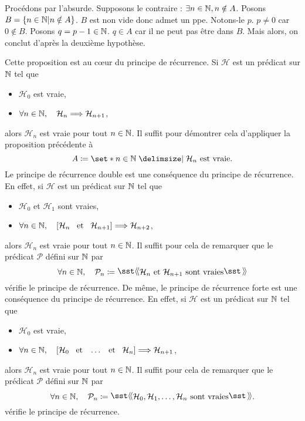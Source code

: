 \documentclass{magnoliaold}
\begin{document}
\begin{preuve}
Procédons par l'absurde. Supposons le contraire : $\exists n\in \mathbb{N}, n\notin A$.
Posons $B=\left\{n\in \mathbb{N} | n\notin A\right\}$. $B$ est non vide donc admet un ppe. Notons-le $p$. $p\neq 0$ car $0\notin B$. Posons $q=p-1 \in \mathbb{N}$. $q\in A$ car il ne peut pas être dans $B$. Mais alors, on conclut d'après la deuxième hypothèse.

\end{preuve}

\begin{remarques}
\remarque Cette proposition est au cœur du principe de récurrence. Si $\mathcal{H}$ est un prédicat sur $\mathbb{N}$ tel que
\begin{itemize}
\item $\mathcal{H}_0$ est vraie,
\item $\forall n\in\mathbb{N},\quad \mathcal{H}_n \Longrightarrow \mathcal{H}_{n+1}$,
\end{itemize}
alors $\mathcal{H}_n$ est vraie pour tout $n\in\mathbb{N}$. Il suffit pour démontrer cela d'appliquer la proposition précédente à \[A\defeq\enstq{n\in\N}{\text{$\mathcal{H}_n$ est vraie}}.\]
\remarque Le principe de récurrence double est une conséquence du principe de récurrence. En effet, si $\mathcal{H}$ est un prédicat sur $\mathbb{N}$ tel que
\begin{itemize}
\item $\mathcal{H}_0$ et $\mathcal{H}_1$ sont vraies,
\item $\forall n\in\mathbb{N},\quad \left[\mathcal{H}_n \quad\!\text{et}\quad\! \mathcal{H}_{n+1}\right]\Longrightarrow \mathcal{H}_{n+2}$,
\end{itemize}
alors $\mathcal{H}_n$ est vraie pour tout $n\in\mathbb{N}$. Il suffit pour cela de remarquer que le prédicat $\mathcal{P}$ défini sur $\mathbb{N}$ par \[\forall n\in\N\qsep \mathcal{P}_n\defeq\text{\og} \mathcal{H}_n\text{ et }\mathcal{H}_{n+1}\text{ sont vraies} \text{\fg}\]
vérifie le principe de récurrence.
\remarque De même, le principe de récurrence forte est une conséquence du principe de récurrence.
  En effet, si $\mathcal{H}$ est un prédicat sur $\mathbb{N}$ tel que
\begin{itemize}
\item $\mathcal{H}_0$ est vraie,
\item $\forall n\in\mathbb{N},\quad \left[\mathcal{H}_0 \quad\!\text{et}\quad\!\ldots\quad\!\text{et}\quad\! \mathcal{H}_n\right]\Longrightarrow \mathcal{H}_{n+1}$,
\end{itemize}
  alors $\mathcal{H}_n$ est vraie pour tout $n\in\mathbb{N}$. Il suffit pour cela de remarquer que le prédicat $\mathcal{P}$ défini sur $\mathbb{N}$ par 
\[\forall n\in\N\qsep \mathcal{P}_n\defeq\text{\og} \mathcal{H}_0, \mathcal{H}_1, \ldots, \mathcal{H}_{n}\text{ sont vraies} \text{\fg}.\]
vérifie le principe de récurrence.
\end{remarques}
\end{document}
